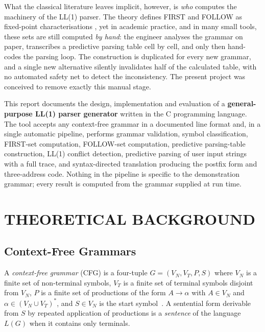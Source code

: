 \documentclass[12pt,a4paper,oneside,openany]{report}
\begin{document}
What the classical literature leaves implicit, however, is \emph{who}
computes the machinery of the LL(1) parser. The theory defines FIRST and
FOLLOW as fixed-point characterisations \cite{aho2006compilers,
aho1972}, yet in academic practice, and in many small tools, these sets are
still computed \emph{by hand}: the engineer analyses the grammar on paper,
transcribes a predictive parsing table cell by cell, and only then
hand-codes the parsing loop. The construction is duplicated for every new
grammar, and a single new alternative silently invalidates half of the
calculated table, with no automated safety net to detect the
inconsistency. The present project was conceived to remove exactly this
manual stage.

This report documents the design, implementation and evaluation of a
\textbf{general-purpose LL(1) parser generator} written in the C programming
language. The tool accepts any context-free grammar in a documented line
format and, in a single automatic pipeline, performs grammar validation,
symbol classification, FIRST-set computation, FOLLOW-set computation,
predictive parsing-table construction, LL(1) conflict detection, predictive
parsing of user input strings with a full trace, and syntax-directed
translation producing the postfix form and three-address code. Nothing in
the pipeline is specific to the demonstration grammar; every result is
computed from the grammar supplied at run time.

\section{THEORETICAL BACKGROUND}
\subsection{Context-Free Grammars}
A \emph{context-free grammar} (CFG) is a four-tuple
$G = (V_N, V_T, P, S)$ where $V_N$ is a finite set of non-terminal symbols,
$V_T$ is a finite set of terminal symbols disjoint from $V_N$, $P$ is a
finite set of productions of the form $A \to \alpha$ with $A \in V_N$ and
$\alpha \in (V_N \cup V_T)^{*}$, and $S \in V_N$ is the start
symbol~\cite{aho1972}. A sentential form derivable from $S$ by repeated
application of productions is a \emph{sentence} of the language $L(G)$ when
it contains only terminals.
\end{document}

